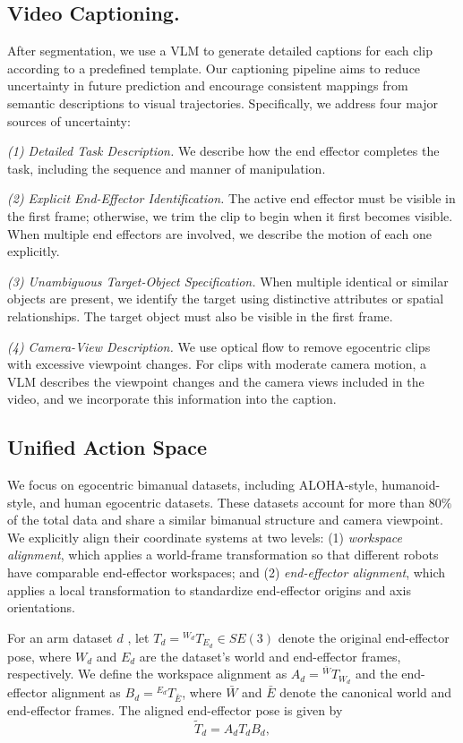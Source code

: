\subsection{Video Captioning.}\label{app_video}
After segmentation, we use a VLM to generate detailed captions for each clip according to a predefined template. Our captioning pipeline aims to reduce uncertainty in future prediction and encourage consistent mappings from semantic descriptions to visual trajectories. Specifically, we address four major sources of uncertainty:

\textit{(1) Detailed Task Description.}
We describe how the end effector completes the task, including the sequence and manner of manipulation.

\textit{(2) Explicit End-Effector Identification.}
The active end effector must be visible in the first frame; otherwise, we trim the clip to begin when it first becomes visible. When multiple end effectors are involved, we describe the motion of each one explicitly.

\textit{(3) Unambiguous Target-Object Specification.}
When multiple identical or similar objects are present, we identify the target using distinctive attributes or spatial relationships. The target object must also be visible in the first frame.

\textit{(4) Camera-View Description.}
We use optical flow to remove egocentric clips with excessive viewpoint changes. For clips with moderate camera motion, a VLM describes the viewpoint changes and the camera views included in the video, and we incorporate this information into the caption.

\subsection{Unified Action Space}

We focus on egocentric bimanual datasets, including ALOHA-style,
humanoid-style, and human egocentric datasets. These datasets
account for more than \(80\%\) of the total data and share a
similar bimanual structure and camera viewpoint.
We explicitly align their coordinate systems at two levels:
(1) \textit{workspace alignment}, which applies a world-frame
transformation so that different robots have comparable
end-effector workspaces; and (2) \textit{end-effector alignment},
which applies a local transformation to standardize end-effector
origins and axis orientations. 

For an arm dataset \(d\) , let
\(T_d = {}^{W_d}T_{E_d} \in SE(3)\) denote the original
end-effector pose, where \(W_d\) and \(E_d\) are the dataset's
world and end-effector frames, respectively.
We define the workspace alignment as
\(A_d = {}^{\bar{W}}T_{W_d}\) and the end-effector alignment as
\(B_d = {}^{E_d}T_{\bar{E}}\), where \(\bar{W}\) and \(\bar{E}\)
denote the canonical world and end-effector frames.
The aligned end-effector pose is given by
\begin{equation}
    \widetilde{T}_d = A_d T_d B_d,
    \label{eq:coordinate_alignment}
\end{equation}
\newpage
